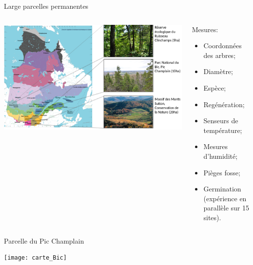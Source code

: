 \documentclass{eecslides}
\begin{document}

	\begin{frame}{Large parcelles permanentes}
		\begin{columns}
			\begin{column}{0.5\textwidth}
				\begin{center}
					\includegraphics[height=0.5\textheight]{carte_parcelles}
				\end{center}
			\end{column}
			\begin{column}{0.5\textwidth}
			Mesures:
				\begin{itemize}
					\item Coordonnées des arbres;
					\item Diamètre;
					\item Espèce;			
					\item Regénération;
					\item Senseurs de température;
					\item Mesures d'humidité;
					\item Pièges fosse;
					\item Germination (expérience en parallèle sur 15 sites).
				\end{itemize}
			\end{column}
		\end{columns}	    	
	\end{frame}


	\begin{frame}{Parcelle du Pic Champlain}
				\begin{center}
					\texttt{[image: carte\_Bic]}
				\end{center}
	\end{frame}
\end{document}
